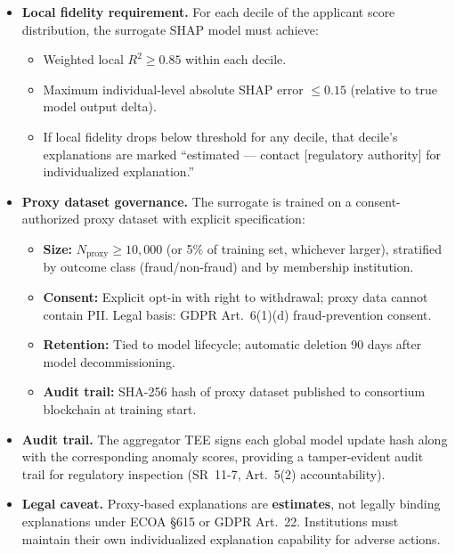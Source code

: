 \documentclass[10pt,journal]{IEEEtran}
\begin{document}
\begin{itemize}
  \item \textbf{Local fidelity requirement.} For each decile of the applicant score distribution, the surrogate SHAP model must achieve:
  \begin{itemize}
    \item Weighted local $R^2 \ge 0.85$ within each decile.
    \item Maximum individual-level absolute SHAP error $\le 0.15$ (relative to true model output delta).
    \item If local fidelity drops below threshold for any decile, that decile's explanations are marked ``estimated --- contact [regulatory authority] for individualized explanation.''
  \end{itemize}

  \item \textbf{Proxy dataset governance.} The surrogate is trained on a consent-authorized proxy dataset with explicit specification:
  \begin{itemize}
    \item \textbf{Size:} $N_{\text{proxy}} \ge 10,\!000$ (or 5\% of training set, whichever larger), stratified by outcome class (fraud/non-fraud) and by membership institution.
    \item \textbf{Consent:} Explicit opt-in with right to withdrawal; proxy data cannot contain PII. Legal basis: GDPR Art.~6(1)(d) fraud-prevention consent.
    \item \textbf{Retention:} Tied to model lifecycle; automatic deletion 90 days after model decommissioning.
    \item \textbf{Audit trail:} SHA-256 hash of proxy dataset published to consortium blockchain at training start.
  \end{itemize}

  \item \textbf{Audit trail.} The aggregator TEE signs each global model update hash along with the corresponding anomaly scores, providing a tamper-evident audit trail for regulatory inspection (SR~11-7, Art.~5(2) accountability).

  \item \textbf{Legal caveat.} Proxy-based explanations are \textbf{estimates}, not legally binding explanations under ECOA \S615 or GDPR Art.~22. Institutions must maintain their own individualized explanation capability for adverse actions.
\end{itemize}
\end{document}
